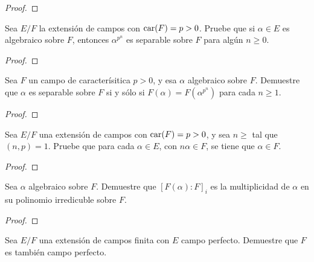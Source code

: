 \documentclass[12pt]{report}
\theoremstyle{largebreak}
\newcommand{\car}[1]{\ensuremath{\textup{car}(#1)}}
\begin{document}
    \begin{proof}
        
    \end{proof}

    \begin{excer}
        Sea $E/F$ la extensión de campos con $\car{F}=p>0$. Pruebe que si $\alpha\in E$ es algebraico sobre $F$, entonces $\alpha^{p^n}$ es separable sobre $F$ para algún $n\geq0$.
    \end{excer}

    \begin{proof}
        
    \end{proof}

    \begin{excer}
        Sea $F$ un campo de caracterísitica $p>0$, y esa $\alpha$ algebraico sobre $F$. Demuestre que $\alpha$ es separable sobre $F$ si y sólo si $F(\alpha)=F(\alpha^{p^n})$ para cada $n\geq1$.
    \end{excer}

    \begin{proof}
        
    \end{proof}

    \begin{excer}
        Sea $E/F$ una extensión de campos con $\car{F}=p>0$, y sea $n\geq$ tal que $\left(n,p\right)=1$. Pruebe que para cada $\alpha\in E$, con $n\alpha\in F$, se tiene que $\alpha\in F$.
    \end{excer}

    \begin{proof}
        
    \end{proof}

    \begin{excer}
        Sea $\alpha$ algebraico sobre $F$. Demuestre que $\left[F(\alpha):F\right]_i$ es la multiplicidad de $\alpha$ en su polinomio irredicuble sobre $F$.
    \end{excer}

    \begin{proof}
        
    \end{proof}

    \begin{excer}
        Sea $E/F$ una extensión de campos finita con $E$ campo perfecto. Demuestre que $F$ es también campo perfecto.
    \end{excer}
\end{document}
